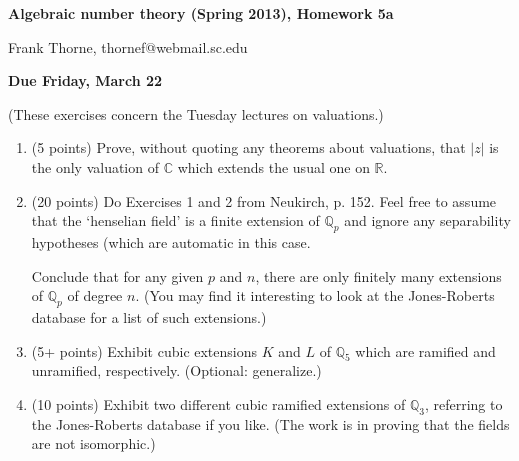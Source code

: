 \documentclass[12pt]{article}
\newcommand{\Q}{\mathbb{Q}}
\begin{document}
\setlength{\topmargin}{-2mm}





\begin{center}{\bf Algebraic number theory (Spring 2013), Homework 5a}
\end{center}
\begin{center}Frank Thorne, thornef@webmail.sc.edu
\end{center}
\begin{center}
{\bf Due Friday, March 22}
\end{center}
(These exercises concern the Tuesday lectures on valuations.)

\begin{enumerate}
\item (5 points)
Prove, without quoting any theorems about valuations, that $|z|$ is the only valuation of $\mathbb{C}$ which extends
the usual one on $\mathbb{R}$.

\item (20 points)
Do Exercises 1 and 2 from Neukirch, p. 152. Feel free to assume that the `henselian field' is a finite extension of
$\Q_p$ and ignore any separability hypotheses (which are automatic in this case.

Conclude that for any given $p$ and $n$, there are only finitely many extensions of $\Q_p$ of degree $n$.
(You may find it interesting to look at the Jones-Roberts database for a list of such extensions.)

\item (5+ points)
Exhibit cubic extensions $K$ and $L$ of $\Q_5$ which are ramified and unramified, respectively.
(Optional: generalize.)

\item (10 points)
Exhibit two different cubic ramified extensions of $\Q_3$, referring to the Jones-Roberts database if you like.
(The work is in proving that the fields are not isomorphic.)

\end{enumerate}
\end{document}
